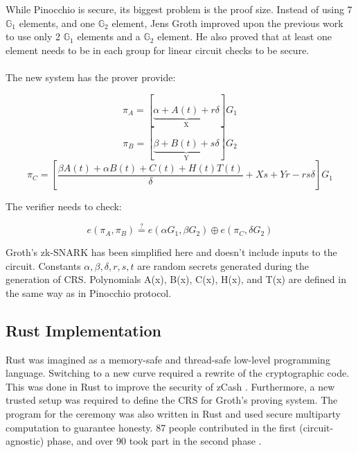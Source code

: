 While Pinocchio is secure, its biggest problem is the proof size. Instead of using 7 $\mathbb{G}_1$ elements, and one $\mathbb{G}_2$ element, Jens Groth \cite{groth2016size} improved upon the previous work to use only 2 $\mathbb{G}_1$ elements and a $\mathbb{G}_2$ element. He also proved that at least one element needs to be in each group for linear circuit checks to be secure.\\
\\
The new system has the prover provide:

$$ \pi_A = [\underbrace{\alpha + A(t) + r\delta}_\text{X}]G_1 $$
$$ \pi_B = [\underbrace{\beta + B(t) + s\delta}_\text{Y}]G_2 $$
$$ \pi_C = [\frac{\beta A(t) + \alpha B(t) + C(t) + H(t)T(t)}{\delta} + Xs + Yr - rs\delta]G_1 $$

\noindent The verifier needs to check:

$$ e(\pi_A, \pi_B) \stackrel{?}{=} e(\alpha G_1, \beta G_2) \oplus e(\pi_C, \delta G_2) $$

\noindent Groth's zk-SNARK has been simplified here and doesn't include inputs to the circuit. Constants $\alpha, \beta, \delta, r, s, t$ are random secrets generated during the generation of CRS. Polynomials A(x), B(x), C(x), H(x), and T(x) are defined in the same way as in Pinocchio \cite{parno2013pinocchio} protocol.

\subsection{Rust Implementation}

Rust \cite{rustlang} was imagined as a memory-safe and thread-safe low-level programming language. Switching to a new curve required a rewrite of the cryptographic code. This was done in Rust to improve the security of zCash \cite{zcashbellman}. Furthermore, a new trusted setup was required to define the CRS for Groth's proving system. The program for the ceremony was also written in Rust and used secure multiparty computation to guarantee honesty. 87 people contributed in the first (circuit-agnostic) phase, and over 90 took part in the second phase \cite{zcashparamgen}.